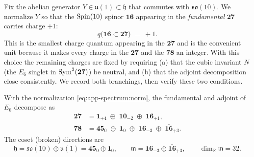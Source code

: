 Fix the abelian generator $Y\in\mathfrak u(1)\subset\mathfrak h$ that
commutes with $\mathfrak{so}(10)$. We normalize $Y$ so that the
$\operatorname{Spin}(10)$ spinor $\mathbf{16}$ appearing in the \emph{fundamental}
$\mathbf{27}$ carries charge $+1$:
\begin{equation}
  q\bigl(\mathbf{16}\subset\mathbf{27}\bigr) \;=\; +1 .
  \label{eq:app-spectrum:norm}
\end{equation}
This is the smallest charge quantum appearing in the $\mathbf{27}$ and
is the convenient unit because it makes every charge in the
$\mathbf{27}$ and the $\mathbf{78}$ an integer. With this choice the
remaining charges are fixed by requiring (a) that the cubic invariant
$N$ (the $E_6$ singlet in $\operatorname{Sym}^3(\mathbf{27})$) be neutral, and (b)
that the adjoint decomposition close consistently. We record both
branchings, then verify these two conditions.

\begin{theorem}[Branchings under $H=\Spin(10)\times U(1)$]
\label{thm:app-spectrum:branchings}
With the normalization \eqref{eq:app-spectrum:norm}, the fundamental and
adjoint of $E_6$ decompose as
\begin{align}
  \mathbf{27}
    &= \mathbf{1}_{+4}\;\oplus\;\mathbf{10}_{-2}\;\oplus\;\mathbf{16}_{+1},
    \label{eq:app-spectrum:27}\\[2pt]
  \mathbf{78}
    &= \mathbf{45}_{0}\;\oplus\;\mathbf{1}_{0}\;\oplus\;
       \mathbf{16}_{-3}\;\oplus\;\overline{\mathbf{16}}_{+3}.
    \label{eq:app-spectrum:78}
\end{align}
The coset (broken) directions are
\begin{equation}
  \mathfrak h = \mathfrak{so}(10)\oplus\mathfrak u(1)
     = \mathbf{45}_{0}\oplus\mathbf{1}_{0},
  \qquad
  \mathfrak m = \mathbf{16}_{-3}\oplus\overline{\mathbf{16}}_{+3},
  \qquad \dim_{\mathbb R}\mathfrak m = 32 .
  \label{eq:app-spectrum:hm}
\end{equation}
\end{theorem}

